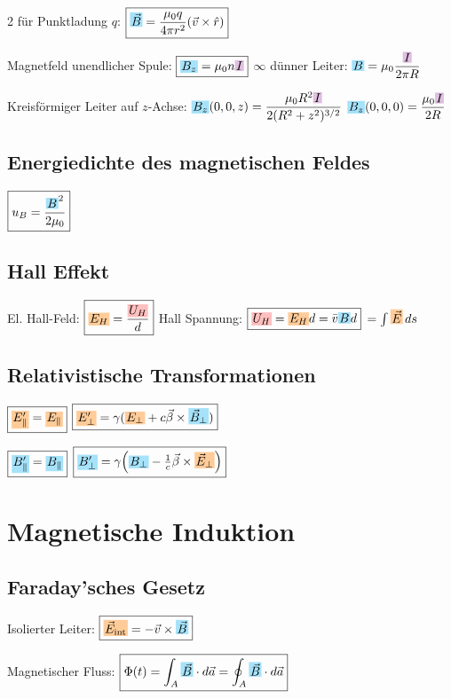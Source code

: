 \documentclass[10pt,a4paper]{article}
\newcommand{\icc}[1]{{\setlength\fboxsep{1pt}\colorbox{violet!25}{\ensuremath{#1}}}}
\newcommand{\efc}[1]{{\setlength\fboxsep{1pt}\colorbox{orange!40}{\ensuremath{#1}}}}
\newcommand{\bfc}[1]{{\setlength\fboxsep{1pt}\colorbox{cyan!35}{\ensuremath{#1}}}}
\newcommand{\vc}[1]{{\setlength\fboxsep{1pt}\colorbox{red!25}{\ensuremath{#1}}}}
\begin{document}
\begin{multicols}{2}
für Punktladung $q$: $\boxed{\bfc{\vec{B}}=\dfrac{\mu_0 q}{4\pi r^2}(\vec{v}\times\hat{r})}$

Magnetfeld unendlicher Spule: $\boxed{\bfc{B_z}=\mu_0 n\icc{I}}$ \quad $\infty$ dünner Leiter: $\bfc{B}=\mu_0\dfrac{\icc{I}}{2\pi R}$

Kreisförmiger Leiter auf $z$-Achse:
$\bfc{B_z}(0,0,z)=\dfrac{\mu_0 R^2 \icc{I}}{2(R^2+z^2)^{3/2}}$ \quad $\bfc{B_z}(0,0,0)=\dfrac{\mu_0 \icc{I}}{2R}$

\subsection{Energiedichte des magnetischen Feldes}

$\boxed{u_B=\dfrac{\bfc{B}^2}{2\mu_0}}$

\subsection{Hall Effekt}

El. Hall-Feld: $\boxed{\efc{E_H}=\dfrac{\vc{U_H}}{d}}$ \quad Hall Spannung: $\boxed{\vc{U_H}=\efc{E_H} d=\bar{v}\bfc{B}d}$ $=\int\efc{\vec{E}}\,ds$

\subsection{Relativistische Transformationen}

$\boxed{\efc{E'_\parallel}=\efc{E_\parallel}}$ \quad $\boxed{\efc{E'_\perp}=\gamma(\efc{E_\perp}+c\vec{\beta}\times\bfc{\vec{B}_\perp})}$

$\boxed{\bfc{B'_\parallel}=\bfc{B_\parallel}}$ \quad $\boxed{\bfc{B'_\perp}=\gamma\!\left(\bfc{B_\perp}-\tfrac{1}{c}\vec{\beta}\times\efc{\vec{E}_\perp}\right)}$

\section{Magnetische Induktion}

\subsection{Faraday'sches Gesetz}

Isolierter Leiter: $\boxed{\efc{\vec{E}_{\text{int}}}=-\vec{v}\times\bfc{\vec{B}}}$

Magnetischer Fluss: $\boxed{\Phi(t)=\int_A\bfc{\vec{B}}\cdot d\vec{a}=\oint_A\bfc{\vec{B}}\cdot d\vec{a}}$


\end{multicols}
\end{document}
